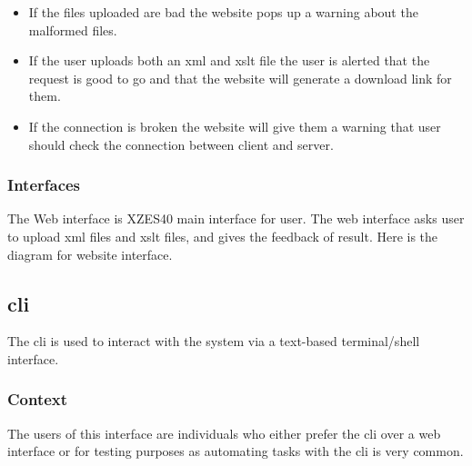 \begin{itemize}
    \item If the files uploaded are bad the website pops up a warning about the malformed files.
    \item  If the user uploads both an \gls{xml} and \gls{xslt} file the user is alerted that the request is good to go and that the website will generate a download link for them.
    \item If the connection is broken the website will give them a warning that user should check the connection between client and server.
\end{itemize}

\subsubsection{Interfaces}

The Web interface is XZES40 main interface for user.
The web interface asks user to upload \gls{xml} files and \gls{xslt} files, and gives the feedback of result.
Here is the diagram for website interface.


\subsection{\gls{cli}}
\label{cli}

The \gls{cli} is used to interact with the system via a text-based terminal/shell interface.

\subsubsection{Context}

The users of this interface are individuals who either prefer the \gls{cli} over a web interface or for testing purposes as automating tasks with the \gls{cli} is very common.

